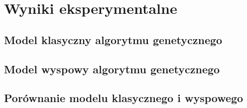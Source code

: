 \chapter{Wyniki eksperymentalne}
\thispagestyle{chapterBeginStyle}


\section{Model klasyczny algorytmu genetycznego}

\section{Model wyspowy algorytmu genetycznego}

\section{Porównanie modelu klasycznego i wyspowego}